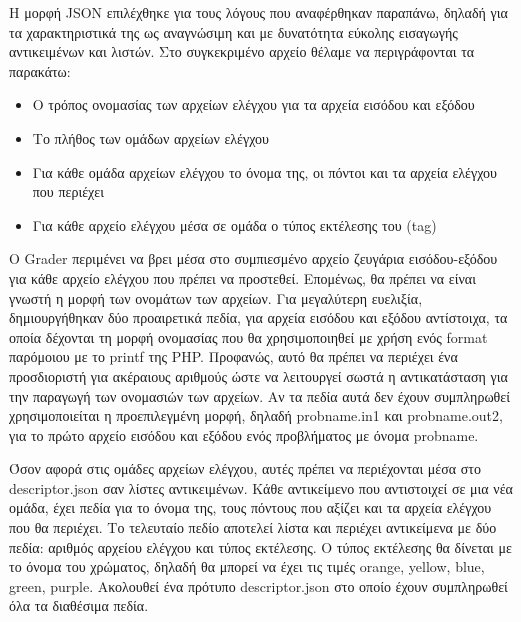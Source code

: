 \documentclass[diploma]{softlab-thesis}
\begin{document}
\bigskip

Η μορφή JSON επιλέχθηκε για τους λόγους που αναφέρθηκαν παραπάνω, δηλαδή για τα
χαρακτηριστικά της ως αναγνώσιμη και με δυνατότητα εύκολης εισαγωγής αντικειμένων
και λιστών. Στο συγκεκριμένο αρχείο θέλαμε να περιγράφονται τα παρακάτω:

\begin{itemize}
    \item Ο τρόπος ονομασίας των αρχείων ελέγχου για τα αρχεία εισόδου και εξόδου

    \item Το πλήθος των ομάδων αρχείων ελέγχου

    \item Για κάθε ομάδα αρχείων ελέγχου το όνομα της, οι πόντοι
      και τα αρχεία ελέγχου που περιέχει

    \item Για κάθε αρχείο ελέγχου μέσα σε ομάδα ο τύπος εκτέλεσης του (tag)

\end{itemize}

Ο Grader περιμένει να βρει μέσα στο συμπιεσμένο αρχείο ζευγάρια εισόδου-εξόδου
για κάθε αρχείο ελέγχου που πρέπει να προστεθεί. Επομένως, θα πρέπει να είναι
γνωστή η μορφή των ονομάτων των αρχείων. Για μεγαλύτερη ευελιξία,
δημιουργήθηκαν δύο προαιρετικά πεδία, για αρχεία εισόδου και εξόδου αντίστοιχα,
τα οποία δέχονται τη μορφή ονομασίας που θα χρησιμοποιηθεί με χρήση ενός format
παρόμοιου με το printf της PHP. Προφανώς, αυτό θα πρέπει να περιέχει ένα
προσδιοριστή για ακέραιους αριθμούς ώστε να λειτουργεί σωστά η αντικατάσταση
για την παραγωγή των ονομασιών των αρχείων. Αν τα πεδία αυτά δεν έχουν
συμπληρωθεί χρησιμοποιείται η προεπιλεγμένη μορφή, δηλαδή probname.in1 και
probname.out2, για το πρώτο αρχείο εισόδου και εξόδου ενός προβλήματος με όνομα
probname.

\bigskip

Όσον αφορά στις ομάδες αρχείων ελέγχου, αυτές πρέπει να περιέχονται μέσα στο
descriptor.json σαν λίστες αντικειμένων. Κάθε αντικείμενο που αντιστοιχεί σε
μια νέα ομάδα, έχει πεδία για το όνομα της, τους πόντους που αξίζει και τα
αρχεία ελέγχου που θα περιέχει. Το τελευταίο πεδίο αποτελεί λίστα και περιέχει
αντικείμενα με δύο πεδία: αριθμός αρχείου ελέγχου και τύπος εκτέλεσης. Ο τύπος
εκτέλεσης θα δίνεται με το όνομα του χρώματος, δηλαδή θα μπορεί να έχει τις
τιμές orange, yellow, blue, green, purple. Ακολουθεί ένα πρότυπο
descriptor.json στο οποίο έχουν συμπληρωθεί όλα τα διαθέσιμα πεδία.
\end{document}
